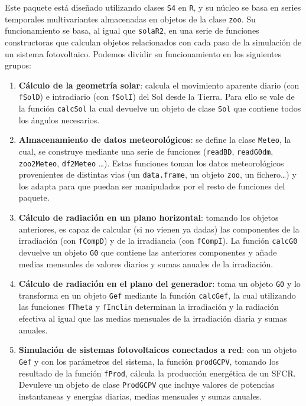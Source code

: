 Este paquete está diseñado utilizando clases \texttt{S4} en \texttt{R}, y su núcleo se basa en series temporales multivariantes almacenadas en objetos de la clase \texttt{zoo}. Su funcionamiento se basa, al igual que \texttt{solaR2}, en una serie de funciones constructoras que calculan objetos relacionados con cada paso de la simulación de un sistema fotovoltaico. Podemos dividir su funcionamiento en los siguientes grupos:
\begin{enumerate}
\item \textbf{Cálculo de la geometría solar}: calcula el movimiento aparente diario (con \texttt{fSolD}) e intradiario (con \texttt{fSolI}) del Sol desde la Tierra. Para ello se vale de la función \texttt{calcSol} la cual devuelve un objeto de clase \texttt{Sol} que contiene todos los ángulos necesarios.
\item \textbf{Almacenamiento de datos meteorológicos}: se define la clase \texttt{Meteo}, la cual, se construye mediante una serie de funciones (\texttt{readBD}, \texttt{readG0dm}, \texttt{zoo2Meteo}, \texttt{df2Meteo} \ldots{}). Estas funciones toman los datos meteorológicos provenientes de distintas vias (un \texttt{data.frame}, un objeto \texttt{zoo}, un fichero\ldots{}) y los adapta para que puedan ser manipulados por el resto de funciones del paquete.
\item \textbf{Cálculo de radiación en un plano horizontal}: tomando los objetos anteriores, es capaz de calcular (si no vienen ya dadas) las componentes de la irradiación (con \texttt{fCompD}) y de la irradiancia (con \texttt{fCompI}). La función \texttt{calcG0} devuelve un objeto \texttt{G0} que contiene las anteriores componentes y añade medias mensuales de valores diarios y sumas anuales de la irradiación.
\item \textbf{Cálculo de radiación en el plano del generador}: toma un objeto \texttt{G0} y lo transforma en un objeto \texttt{Gef} mediante la función \texttt{calcGef}, la cual utilizando las funciones \texttt{fTheta} y \texttt{fInclin} determinan la irradiación y la radiación efectiva al igual que las medias mensuales de la irradiación diaria y sumas anuales.
\item \textbf{Simulación de sistemas fotovoltaicos conectados a red}: con un objeto \texttt{Gef} y con los parámetros del sistema, la función \texttt{prodGCPV}, tomando los resultado de la función \texttt{fProd}, cálcula la producción energética de un SFCR. Devuleve un objeto de clase \texttt{ProdGCPV} que incluye valores de potencias instantaneas y energías diarias, medias mensuales y sumas anuales.

\end{enumerate}
